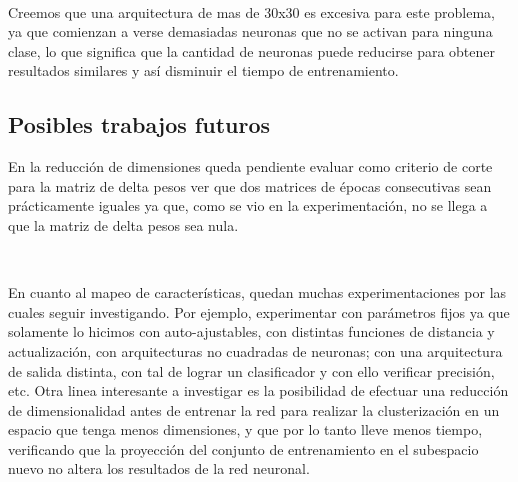 \documentclass[informe.tex]{subfiles}
\begin{document}
    ~
    
    Creemos que una arquitectura de mas de 30x30 es excesiva para este problema, ya que comienzan a verse demasiadas neuronas que no se activan para ninguna clase, lo que significa que la cantidad de neuronas puede reducirse para obtener resultados similares y as\'i disminuir el tiempo de entrenamiento.
  
    \subsection{Posibles trabajos futuros}
    
    En la reducción de dimensiones queda pendiente evaluar como criterio de corte para la matriz de delta pesos ver que dos matrices de épocas consecutivas sean prácticamente iguales ya que, como se vio en la experimentación, no se llega a que la matriz de delta pesos sea nula.
    
    ~
    
    En cuanto al mapeo de características, quedan muchas experimentaciones por las cuales seguir investigando. Por ejemplo, experimentar con par\'ametros fijos ya que solamente lo hicimos con auto-ajustables, con distintas funciones de distancia y actualizaci\'on, con arquitecturas no cuadradas de neuronas; con una arquitectura de salida distinta, con tal de lograr un clasificador y con ello verificar precisi\'on, etc. Otra linea interesante a investigar es la posibilidad de efectuar una reducción de dimensionalidad antes de entrenar la red para realizar la clusterizaci\'on en un espacio que tenga menos dimensiones, y que por lo tanto lleve menos tiempo, verificando que la proyecci\'on del conjunto de entrenamiento en el subespacio nuevo no altera los resultados de la red neuronal.
    
\end{document}
